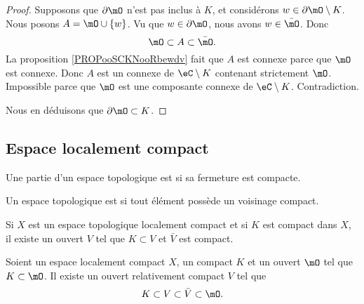 \begin{proof}
    Supposons que \( \partial\mO\) n'est pas inclus à \( K\), et considérons \( w\in\partial\mO\setminus K\). Nous posons \( A=\mO\cup\{ w \}\). Vu que \( w\in\partial\mO\), nous avons \( w\in\bar\mO\). Donc
    \begin{equation}
        \mO\subset A\subset\bar\mO.
    \end{equation}
    La proposition \ref{PROPooSCKNooRbewdv} fait que \( A\) est connexe parce que \( \mO\) est connexe. Donc \( A\) est un connexe de \( \eC\setminus K\) contenant strictement \( \mO\). Impossible parce que \( \mO\) est une composante connexe de \( \eC\setminus K\). Contradiction.

    Nous en déduisons que \( \partial\mO\subset K\).
\end{proof}

\subsection{Espace localement compact}

\begin{definition}      \label{DEFooBODRooEFhzeT}
	Une partie d'un espace topologique est  si sa fermeture  est compacte.
\end{definition}

\begin{definition}  \label{DefEIBYooAWoESf}
	Un espace topologique est  si tout élément possède un voisinage compact.
\end{definition}

\begin{lemma}       \label{LEMooAXESooYvyesg}
	Si \( X\) est un espace topologique localement compact et si \( K\) est compact dans \( X\), il existe un ouvert \( V\) tel que \( K\subset V\) et \( \bar V\) est compact.
\end{lemma}

\begin{lemma}       \label{LEMooKYMKooPxZjWN}
	Soient un espace localement compact \( X\), un compact \( K\) et un ouvert \( \mO\) tel que \( K\subset \mO\). Il existe un ouvert relativement compact \( V\) tel que
	\begin{equation}
		K\subset V\subset \bar V\subset \mO.
	\end{equation}
\end{lemma}

